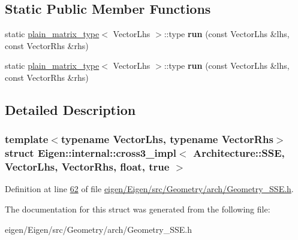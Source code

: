 \subsection*{Static Public Member Functions}
\begin{DoxyCompactItemize}
\item 
\mbox{\label{struct_eigen_1_1internal_1_1cross3__impl_3_01_architecture_1_1_s_s_e_00_01_vector_lhs_00_01_vect981fca9d3c0a247b027e5ff23e43a093_a69ce61c22f1e2e9ffbb446b4cb039b81}} 
static \hyperlink{struct_eigen_1_1internal_1_1plain__matrix__type}{plain\+\_\+matrix\+\_\+type}$<$ Vector\+Lhs $>$\+::type {\bfseries run} (const Vector\+Lhs \&lhs, const Vector\+Rhs \&rhs)
\item 
\mbox{\label{struct_eigen_1_1internal_1_1cross3__impl_3_01_architecture_1_1_s_s_e_00_01_vector_lhs_00_01_vect981fca9d3c0a247b027e5ff23e43a093_a69ce61c22f1e2e9ffbb446b4cb039b81}} 
static \hyperlink{struct_eigen_1_1internal_1_1plain__matrix__type}{plain\+\_\+matrix\+\_\+type}$<$ Vector\+Lhs $>$\+::type {\bfseries run} (const Vector\+Lhs \&lhs, const Vector\+Rhs \&rhs)
\end{DoxyCompactItemize}


\subsection{Detailed Description}
\subsubsection*{template$<$typename Vector\+Lhs, typename Vector\+Rhs$>$\newline
struct Eigen\+::internal\+::cross3\+\_\+impl$<$ Architecture\+::\+S\+S\+E, Vector\+Lhs, Vector\+Rhs, float, true $>$}



Definition at line \hyperlink{eigen_2_eigen_2src_2_geometry_2arch_2_geometry___s_s_e_8h_source_l00062}{62} of file \hyperlink{eigen_2_eigen_2src_2_geometry_2arch_2_geometry___s_s_e_8h_source}{eigen/\+Eigen/src/\+Geometry/arch/\+Geometry\+\_\+\+S\+S\+E.\+h}.



The documentation for this struct was generated from the following file\+:\begin{DoxyCompactItemize}
\item 
eigen/\+Eigen/src/\+Geometry/arch/\+Geometry\+\_\+\+S\+S\+E.\+h\end{DoxyCompactItemize}
